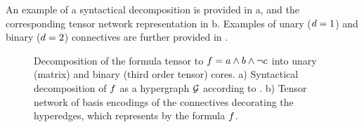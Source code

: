 An example of a syntactical decomposition is provided in a, and the corresponding tensor network representation in b.
Examples of unary ($d=1$) and binary ($d=2$) connectives are further provided in .

\begin{figure}[t]
    \begin{center}
        
    \end{center}
    \caption{Decomposition of the formula tensor to $f = a \land b \land \lnot c$ into unary (matrix) and binary (third order tensor) cores.
    a) Syntactical decomposition of $f$ as a hypergraph $\mathcal{G}$ according to .
    b) Tensor network of basis encodings of the connectives decorating the hyperedges, which represents by  the formula $f$.
    }
    \label{fig:decompositionExample}
\end{figure}




